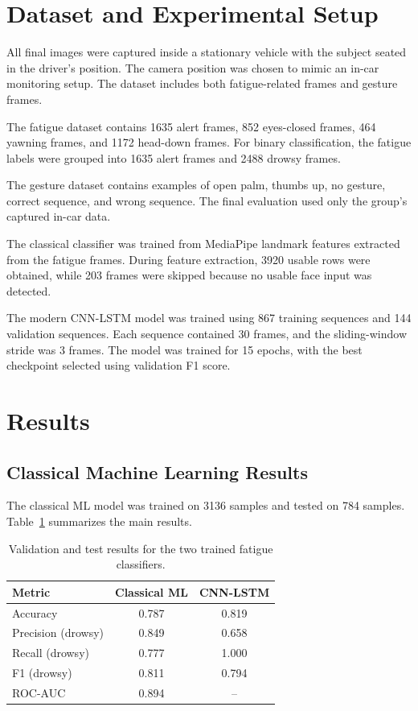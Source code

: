 \documentclass[conference]{IEEEtran}
\begin{document}
\section{Dataset and Experimental Setup}

All final images were captured inside a stationary vehicle with the subject seated in the driver's position. The camera position was chosen to mimic an in-car monitoring setup. The dataset includes both fatigue-related frames and gesture frames.

The fatigue dataset contains 1635 alert frames, 852 eyes-closed frames, 464 yawning frames, and 1172 head-down frames. For binary classification, the fatigue labels were grouped into 1635 alert frames and 2488 drowsy frames.

The gesture dataset contains examples of open palm, thumbs up, no gesture, correct sequence, and wrong sequence. The final evaluation used only the group's captured in-car data.

The classical classifier was trained from MediaPipe landmark features extracted from the fatigue frames. During feature extraction, 3920 usable rows were obtained, while 203 frames were skipped because no usable face input was detected.

The modern CNN-LSTM model was trained using 867 training sequences and 144 validation sequences. Each sequence contained 30 frames, and the sliding-window stride was 3 frames. The model was trained for 15 epochs, with the best checkpoint selected using validation F1 score.

\section{Results}

\subsection{Classical Machine Learning Results}

The classical ML model was trained on 3136 samples and tested on 784 samples. Table~\ref{tab:results} summarizes the main results.

\begin{table}[htbp]
\caption{Validation and test results for the two trained fatigue classifiers.}
\begin{center}
\begin{tabular}{lcc}
\toprule
\textbf{Metric} & \textbf{Classical ML} & \textbf{CNN-LSTM} \\
\midrule
Accuracy & 0.787 & 0.819 \\
Precision (drowsy) & 0.849 & 0.658 \\
Recall (drowsy) & 0.777 & 1.000 \\
F1 (drowsy) & 0.811 & 0.794 \\
ROC-AUC & 0.894 & -- \\
\bottomrule
\end{tabular}
\label{tab:results}
\end{center}
\end{table}
\end{document}
